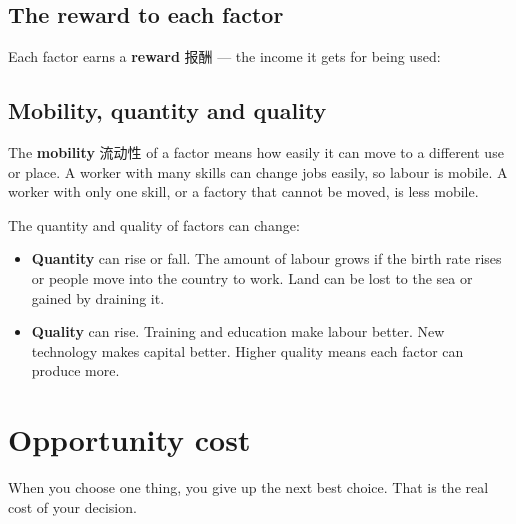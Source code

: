 \documentclass[11pt]{article}
\begin{document}
\subsection*{The reward to each factor}

Each factor earns a \textbf{reward} 报酬 — the income it gets for being used:

\begin{center}
\end{center}

\subsection*{Mobility, quantity and quality}

The \textbf{mobility} 流动性 of a factor means how easily it can move to a different use or place. A worker with many skills can change jobs easily, so labour is mobile. A worker with only one skill, or a factory that cannot be moved, is less mobile.

The quantity and quality of factors can change:

\begin{itemize}
\item \textbf{Quantity} can rise or fall. The amount of labour grows if the birth rate rises or people move into the country to work. Land can be lost to the sea or gained by draining it.

\item \textbf{Quality} can rise. Training and education make labour better. New technology makes capital better. Higher quality means each factor can produce more.

\end{itemize}

\section*{Opportunity cost}

When you choose one thing, you give up the next best choice. That is the real cost of your decision.
\end{document}
